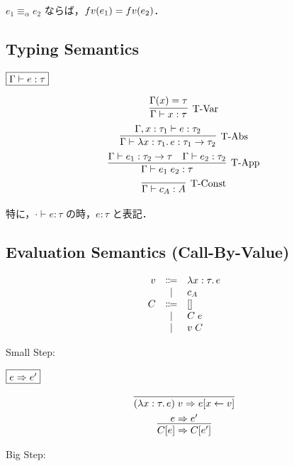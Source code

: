 \begin{theorem}
  $e_1 \equiv_\alpha e_2$ ならば，$\mathop{fv}(e_1) = \mathop{fv}(e_2)$．
\end{theorem}

\subsection{Typing Semantics}

$\fbox{$\Gamma \vdash e: \tau$}$

\begin{gather*}
  \infer[\text{T-Var}]{\Gamma \vdash x: \tau}{\Gamma(x) = \tau}
  \\
  \infer[\text{T-Abs}]{\Gamma \vdash \lambda x: \tau_1\ldotp e: \tau_1 \to \tau_2}{
    \Gamma, x: \tau_1 \vdash e: \tau_2
  }
  \\
  \infer[\text{T-App}]{\Gamma \vdash e_1\; e_2: \tau}{
    \Gamma \vdash e_1: \tau_2 \to \tau
    &
    \Gamma \vdash e_2: \tau_2
  }
  \\
  \infer[\text{T-Const}]{\Gamma \vdash c_A: A}{}
\end{gather*}

特に，$\cdot \vdash e: \tau$ の時，$e: \tau$ と表記．

\subsection{Evaluation Semantics (Call-By-Value)}

\begin{align*}
  \begin{array}{rcl}
  v
  & \Coloneq & \lambda x: \tau\ldotp e \\
  & \mid & c_A \\
  C
  & \Coloneq & [] \\
  & \mid & C\; e \\
  & \mid & v\; C
  \end{array}
\end{align*}

Small Step:

$\fbox{$e \Rightarrow e'$}$

\begin{gather*}
  \infer{(\lambda x: \tau\ldotp e)\; v \smalleval e[x \assign v]}{}
  \\
  \infer{C[e] \smalleval C[e']}{
    e \smalleval e'
  }
\end{gather*}

Big Step:

